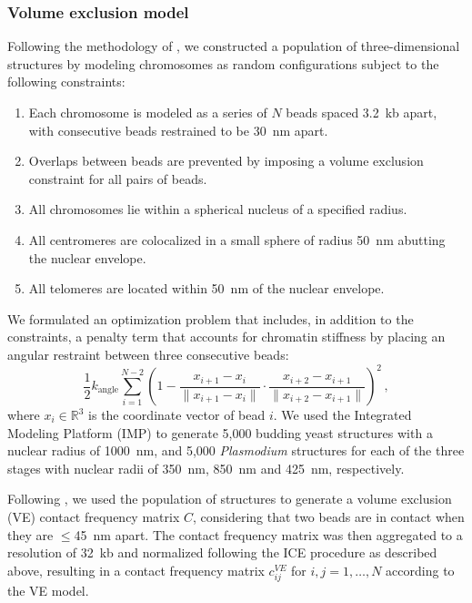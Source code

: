 \subsubsection{Volume exclusion model}
\label{met:volume-exclusion}

Following the methodology of \cite{tjong:physical}, we
constructed a population of three-dimensional structures by modeling
chromosomes as random configurations subject to the following
constraints:
\begin{enumerate}
\item Each chromosome is modeled as a series of $N$ beads spaced 3.2~kb apart,
  with consecutive beads restrained to be 30~nm apart.
\item Overlaps between beads are prevented by imposing a volume
  exclusion constraint for all pairs of beads.
\item All chromosomes lie within a spherical nucleus of a specified
  radius.
\item All centromeres are colocalized in a small sphere of radius
  50~nm abutting the nuclear envelope.
\item All telomeres are located within 50~nm of the nuclear envelope.
\end{enumerate}
We formulated an optimization problem that includes, in addition to the
constraints, a penalty term that accounts for chromatin stiffness by
placing an angular restraint between three consecutive beads:
\begin{equation}
\frac{1}{2} k_{\text{angle}} \sum^{N - 2}_{i = 1} \left( 1 - \frac{x_{i + 1} -
x_i}{\|x_{i + 1} - x_i\|} \cdot \frac{x_{i + 2} - x_{i + 1}}{\|x_{i + 2} -
  x_{i + 1}\|} \right)^2\,,
\end{equation}
where $x_i \in \mathbb{R}^3$ is the coordinate vector of bead $i$.
We used the Integrated Modeling Platform (IMP) \citep{bau:three-dimensional}
to generate 5,000 budding yeast structures with a nuclear radius of
1000~nm, and 5,000 {\em Plasmodium} structures for each of the three
stages with nuclear radii of 350~nm, 850~nm and 425~nm, respectively.

Following \cite{tjong:physical}, we used the population of structures to
generate a volume exclusion (VE) contact frequency matrix $C$,
considering that two beads are in contact when they are $\leq$45~nm apart.
The contact frequency matrix was then aggregated to a resolution of
32~kb and normalized following the ICE procedure as described above,
resulting in a contact frequency matrix
$c_{ij}^{VE}$ for $i,j=1,\ldots,N$ according to the VE model.

